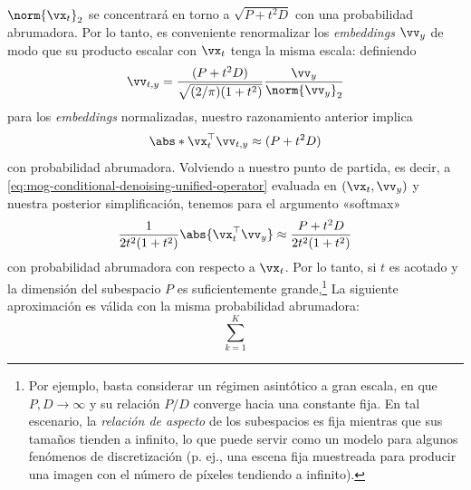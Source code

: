 \documentclass[../../book-main_es.tex]{subfiles}
\begin{document}
\begin{example}
    $\norm{\vx_t}_2$ se concentrará en torno a $\sqrt{P + t^2 D}$ con
    una probabilidad abrumadora.
    Por lo tanto, es conveniente renormalizar los \textit{embeddings} $\vv_y$ de modo que su
    producto escalar con $\vx_t$ tenga la misma escala: definiendo
    \begin{equation*}
        \vv_{t, y} = \frac{(P + t^2 D)}{\sqrt{(2/\pi)(1 + t^2)}}
        \frac{\vv_y}{\norm{\vv_y}_2}
    \end{equation*}
    para los \textit{embeddings} normalizadas, nuestro razonamiento anterior implica
    \begin{equation*}
        \abs*{\vx_t^\top \vv_{t,y}}
        \approx
        (P + t^2 D)
    \end{equation*}
    con probabilidad abrumadora.
    Volviendo a nuestro punto de partida, es decir, a
    \eqref{eq:mog-conditional-denoising-unified-operator} evaluada en $(\vx_t,
    \vv_y)$ y nuestra posterior
    simplificación, tenemos para el argumento «softmax»
    \begin{equation*}
        {\frac{1}{2t^{2}(1 + t^{2})}\abs{\vx_t^\top \vv_y}}
        \approx
        \frac{P + t^2 D}{2t^{2}(1 + t^{2})}
    \end{equation*}
    con probabilidad abrumadora con respecto a $\vx_t$.
    Por lo tanto, si $t$ es acotado y la dimensión del subespacio $P$ es suficientemente
    grande,\footnote{Por ejemplo, basta considerar un régimen asintótico a gran escala,
        en que $P, D \to \infty$ y su relación
        $P/D$ converge
        hacia una constante fija. En tal escenario, la \textit{relación de
        aspecto} de los
        subespacios es fija mientras que sus tamaños tienden a infinito, lo que puede servir como
        un modelo para algunos fenómenos de discretización (p. ej., una escena fija
            muestreada para producir una
    imagen con el número de píxeles tendiendo a infinito).}
    La siguiente aproximación es válida con la misma probabilidad abrumadora:
    \begin{equation}
        \sum_{k = 1}^{K}

\end{equation}
\end{example}
\end{document}
